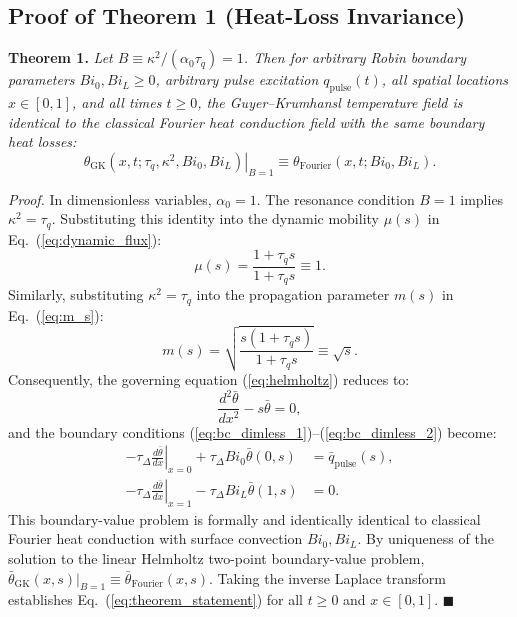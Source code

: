 \documentclass[review,12pt]{article}
\begin{document}
\subsection{Proof of Theorem 1 (Heat-Loss Invariance)}

\textbf{Theorem 1.} \textit{Let $B \equiv \kappa^2 / (\alpha_0 \tau_q) = 1$. Then for arbitrary Robin boundary parameters $Bi_0, Bi_L \ge 0$, arbitrary pulse excitation $q_{\mathrm{pulse}}(t)$, all spatial locations $x \in [0, 1]$, and all times $t \ge 0$, the Guyer--Krumhansl temperature field is identical to the classical Fourier heat conduction field with the same boundary heat losses:}
\begin{equation}
\left. \theta_{\mathrm{GK}}(x, t; \tau_q, \kappa^2, Bi_0, Bi_L) \right|_{B=1} \equiv \theta_{\mathrm{Fourier}}(x, t; Bi_0, Bi_L).
\label{eq:theorem_statement}
\end{equation}

\textit{Proof.} In dimensionless variables, $\alpha_0 = 1$. The resonance condition $B = 1$ implies $\kappa^2 = \tau_q$. Substituting this identity into the dynamic mobility $\mu(s)$ in Eq.~(\ref{eq:dynamic_flux}):
\begin{equation}
\mu(s) = \frac{1 + \tau_q s}{1 + \tau_q s} \equiv 1.
\end{equation}
Similarly, substituting $\kappa^2 = \tau_q$ into the propagation parameter $m(s)$ in Eq.~(\ref{eq:m_s}):
\begin{equation}
m(s) = \sqrt{\frac{s(1 + \tau_q s)}{1 + \tau_q s}} \equiv \sqrt{s}.
\end{equation}
Consequently, the governing equation (\ref{eq:helmholtz}) reduces to:
\begin{equation}
\frac{d^2\bar{\theta}}{dx^2} - s \bar{\theta} = 0,
\end{equation}
and the boundary conditions (\ref{eq:bc_dimless_1})--(\ref{eq:bc_dimless_2}) become:
\begin{align}
-\tau_\Delta \left.\frac{d\bar{\theta}}{dx}\right|_{x=0} + \tau_\Delta Bi_0 \bar{\theta}(0, s) &= \bar{q}_{\mathrm{pulse}}(s), \\
-\tau_\Delta \left.\frac{d\bar{\theta}}{dx}\right|_{x=1} - \tau_\Delta Bi_L \bar{\theta}(1, s) &= 0.
\end{align}
This boundary-value problem is formally and identically identical to classical Fourier heat conduction with surface convection $Bi_0, Bi_L$. By uniqueness of the solution to the linear Helmholtz two-point boundary-value problem, $\bar{\theta}_{\mathrm{GK}}(x, s)|_{B=1} \equiv \bar{\theta}_{\mathrm{Fourier}}(x, s)$. Taking the inverse Laplace transform establishes Eq.~(\ref{eq:theorem_statement}) for all $t \ge 0$ and $x \in [0, 1]$. $\blacksquare$
\end{document}

